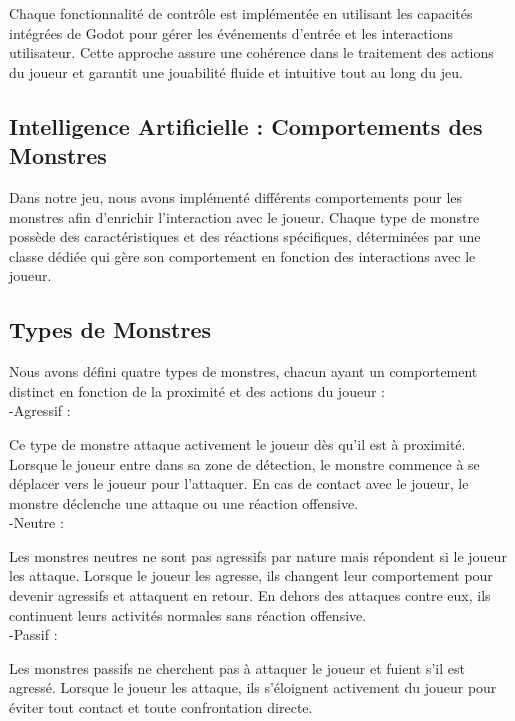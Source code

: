       Chaque fonctionnalité de contrôle est implémentée en utilisant les capacités intégrées de Godot pour gérer
      les événements d'entrée et les interactions utilisateur. Cette approche assure une cohérence dans le traitement des actions du joueur 
      et garantit une jouabilité fluide et intuitive tout au long du jeu.


      \subsection{Intelligence Artificielle : Comportements des Monstres}
      Dans notre jeu, nous avons implémenté différents comportements pour les monstres afin d'enrichir l'interaction avec le joueur. 
      Chaque type de monstre possède des caractéristiques et des réactions spécifiques, déterminées par une classe dédiée qui gère son comportement en
      fonction des interactions avec le joueur.

      \subsection*{Types de Monstres}

      Nous avons défini quatre types de monstres, chacun ayant un comportement distinct en fonction de la proximité et des actions du joueur :
      \\

      -Agressif :

      Ce type de monstre attaque activement le joueur dès qu'il est à proximité.
      Lorsque le joueur entre dans sa zone de détection, le monstre commence à se déplacer vers le joueur pour l'attaquer.
      En cas de contact avec le joueur, le monstre déclenche une attaque ou une réaction offensive.
      \\

      -Neutre :

      Les monstres neutres ne sont pas agressifs par nature mais répondent si le joueur les attaque.
      Lorsque le joueur les agresse, ils changent leur comportement pour devenir agressifs et attaquent en retour.
      En dehors des attaques contre eux, ils continuent leurs activités normales sans réaction offensive.
      \\

      -Passif :

      Les monstres passifs ne cherchent pas à attaquer le joueur et fuient s'il est agressé.
      Lorsque le joueur les attaque, ils s'éloignent activement du joueur pour éviter tout contact et toute confrontation directe.
      \\

